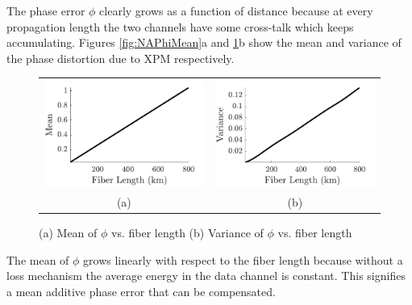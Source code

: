 The phase error $\phi$ clearly grows as a function of distance because at every propagation length the two channels have some cross-talk which keeps accumulating. Figures \ref{fig:NAPhiMean}a and \ref{fig:NAPhiVar}b show the mean and variance of the phase distortion due to XPM respectively.
%
\begin{figure}[htb]
	\begin{tabular}{c c}
		\includegraphics[width=0.5\linewidth]{img/NAPhiMean} & \includegraphics[width=0.5\linewidth]{img/NAPhiVar} \\
		(a) & (b)
	\end{tabular}
	\caption{(a)\label{fig:NAPhiMean} Mean of $\phi$ vs. fiber length (b)\label{fig:NAPhiVar} Variance of $\phi$ vs. fiber length}
\end{figure}
%
The mean of $\phi$ grows linearly with respect to the fiber length because without a loss mechanism the average energy in the data channel is constant. This signifies a mean additive phase error that can be compensated.

